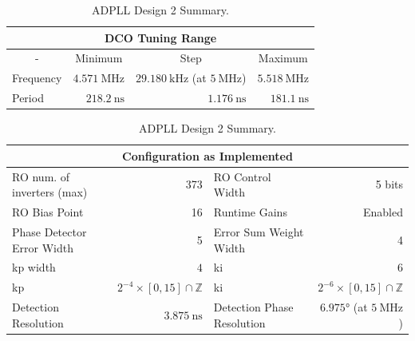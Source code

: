 \begin{table}[!h]
    \begin{center}
        \begin{tabular}{|l|r|r|r|}
            \multicolumn{4}{c}{\ac{DCO} Tuning Range} \T\\
            \hline
            \multicolumn{1}{|c|}{-} & \multicolumn{1}{c|}{Minimum} & \multicolumn{1}{c|}{Step} & \multicolumn{1}{c|}{Maximum} \T\\
            \hline
            Frequency & $4.571~\si{\mega\hertz}$ & $29.180~\si{\kilo\hertz}$ (at $5~\si{\mega\hertz}$) & $5.518~\si{\mega\hertz}$ \T\\
            \hline
            Period & $218.2~\si{\nano\second}$ & $1.176~\si{\nano\second}$ & $181.1~\si{\nano\second}$ \T\\
            \hline
        \end{tabular}
        \begin{tabular}{|l|r|l|r|}
            \multicolumn{4}{c}{Configuration as Implemented} \T\\
            \hline
            \ac{RO} num. of inverters (max) & 373 & \ac{RO} Control Width & 5 bits \T\\
            \hline
            \ac{RO} Bias Point & 16 & Runtime Gains & Enabled \T\\
            \hline
            Phase Detector Error Width & 5 & Error Sum Weight Width & 4 \T\\
            \hline
            \acs{kp} width & $4$ & \acs{ki} & $6$ \T\\
            \hline
            \acs{kp} & $2^{-4}\times[0,15]\cap\mathbb{Z}$ & \acs{ki} & $2^{-6}\times[0,15]\cap\mathbb{Z}$ \T\\
            \hline
            Detection Resolution & $3.875~\si{\nano\second}$ & Detection Phase Resolution & $6.975\si{\degree}$ (at $5~\si{\mega\hertz}$)\\
            \hline
        \end{tabular}
    \end{center}
    \caption[\ac{ADPLL} Design 2 Summary]{\ac{ADPLL} Design 2 Summary.}
    \label{table:adpll2}
\end{table}


